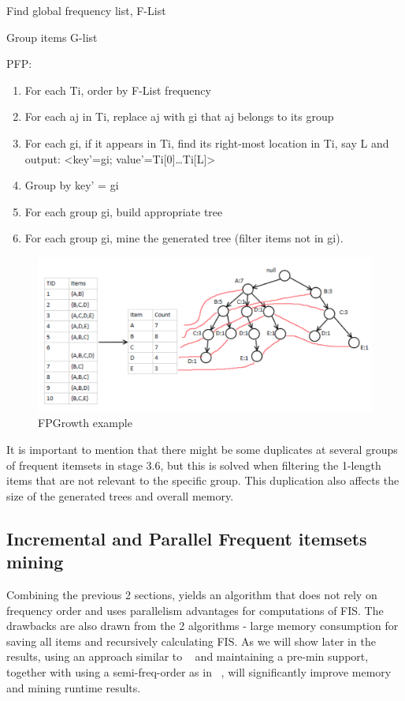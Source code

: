 \begin{steps}
	\item Find global frequency list, F-List
	\item Group items G-list
	\item PFP:
		\begin{enumerate}
			\item For each Ti, order by F-List frequency
			\item For each aj in Ti, replace aj with gi that aj belongs to its group
			\item For each gi, if it appears in Ti, find its right-most location in Ti, say L and output:
 <key'=gi; value'={Ti[0]…Ti[L]}>
 			\item Group by key' = gi
 			\item For each group gi, build appropriate tree
 			\item For each group gi, mine the generated tree (filter items not in gi).
		\end{enumerate}
\end{steps}

\begin{figure}
  \centering
  \includegraphics[width=\linewidth]{figures/fpgrowthexample}
  \caption{FPGrowth example}
  \label{fig:fpgrowthexample}
\end{figure}

It is important to mention that there might be some duplicates at several groups of frequent itemsets in stage 3.6, but this is solved when filtering the 1-length items that are not relevant to the specific group. This duplication also affects the size of the generated trees and overall memory.

\subsection{Incremental and Parallel Frequent itemsets mining}

Combining the previous 2 sections, yields an algorithm that does not rely on frequency order and uses parallelism advantages for computations of FIS.
The drawbacks are also drawn from the 2 algorithms - large memory consumption for saving all items and recursively calculating FIS. As we will show later in the results, using an approach similar to ~\cite{kohefficient} and maintaining a pre-min support, together with using a semi-freq-order as in ~\cite{tanbeer2009efficient}, will significantly improve memory and mining runtime results.

